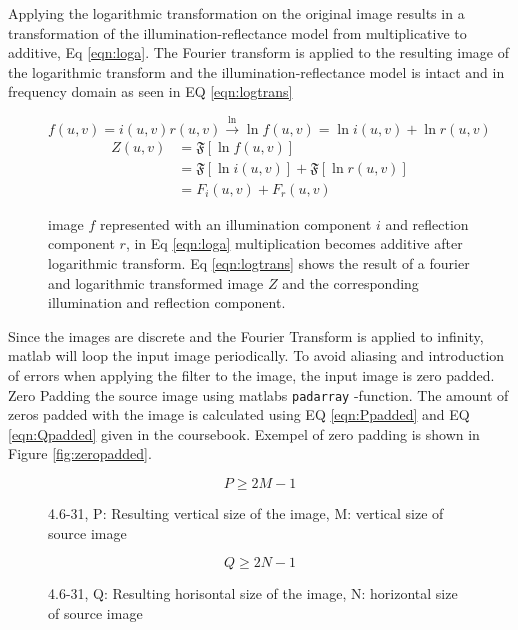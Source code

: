 Applying the logarithmic transformation on the original image results in a transformation of the illumination-reflectance model from multiplicative to additive, Eq \ref{eqn:loga}. The Fourier transform is applied to the resulting image of the logarithmic transform and the illumination-reflectance model is intact and in frequency domain as seen in EQ \ref{eqn:logtrans}
\begin{figure}[h!]
\begin{equation}
  f(u,v) = i(u,v) r(u,v) \xrightarrow{\ln} \ln{f(u,v)} = \ln{i(u,v)} + \ln{r(u,v)} 
  \label{eqn:loga}
\end{equation}
  \begin{equation}
    \begin{split}
      Z(u,v) &= \mathfrak{F} [\ln{f(u,v)}]\\ &= \mathfrak{F}[\ln{i(u,v)}] + \mathfrak{F}[\ln{r(u,v)}]\\ &= F_i(u,v) + F_r(u,v)
    \end{split}
    \label{eqn:logtrans}
  \end{equation}
\caption{image $f$ represented with an illumination component $i$ and reflection component $r$, in Eq \ref{eqn:loga} multiplication becomes additive after logarithmic transform. Eq \ref{eqn:logtrans} shows the result of a fourier and logarithmic transformed image $Z$ and the corresponding illumination and reflection component.}
\end{figure}

Since the images are discrete and the Fourier Transform is applied to infinity, matlab will loop the input image periodically. To avoid aliasing and introduction of errors when applying the filter to the image, the input image is zero padded. Zero Padding the source image using matlabs \verb~padarray~ -function. The amount of zeros padded with the image is calculated using EQ \ref{eqn:Ppadded} and EQ \ref{eqn:Qpadded} given in the coursebook\cite[p. 274]{dipBook}. Exempel of zero padding is shown in Figure \ref{fig:zeropadded}.
\begin{figure}[h!]
\begin{equation}
  P \geq 2M -1
  \label{eqn:Ppadded}
\end{equation}
\caption{4.6-31, P: Resulting vertical size of the image, M: vertical size of source image}
\end{figure}

\begin{figure}[h!]
  \begin{equation}
    Q \geq 2N -1
    \label{eqn:Qpadded}
  \end{equation}
  \caption{4.6-31, Q: Resulting horisontal size of the image, N: horizontal size of source image}
\end{figure}

